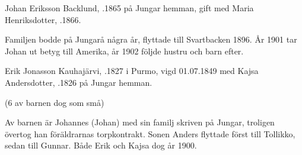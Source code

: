 Johan Eriksson Backlund, .1865 på Jungar hemman, gift med Maria Henriksdotter, .1866.
\begin{jhchildren}
  \item {}
  \item {}
  \item {}
  \item {}
  \item {}
  \item {}
\end{jhchildren}
Familjen bodde på Jungarå några år, flyttade till Svartbacken 1896. År 1901 tar Johan ut betyg till Amerika, år 1902 följde hustru och barn efter.


Erik Jonasson Kauhajärvi, .1827 i Purmo, vigd 01.07.1849 med Kajsa Andersdotter, .1826 på Jungar hemman.
\begin{jhchildren}
  \item {}
  \item {}
  \item {}
  \item {}
  \item {}
  \item {}
  \item {}
  \item {}
  \item {}
  \item {}
\end{jhchildren}
(6 av barnen dog som små)

Av barnen är Johannes (Johan) med sin familj skriven på Jungar, troligen övertog han föräldrarnas torpkontrakt. Sonen Anders flyttade först till Tollikko, sedan till Gunnar. Både Erik och Kajsa dog år 1900.



